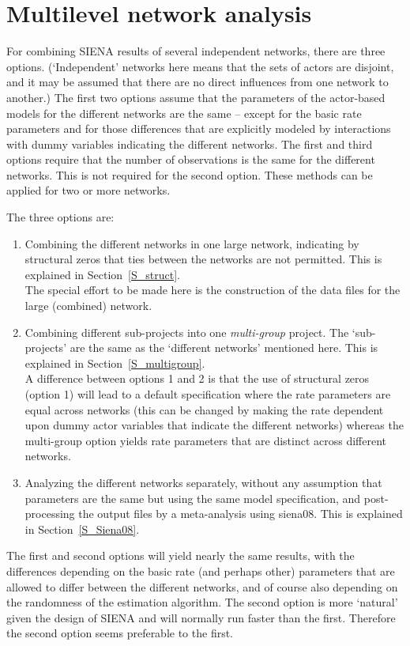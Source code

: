 \documentclass[a4paper,fleqn,11pt]{article}
\newcommand{\+}{\, + \,}
\newcommand{\SI}{{\sf SIENA }}
\begin{document}
\newpage
\section{Multilevel network analysis}
\label{S_mulev}

For combining \SI results of several independent networks,
there are three options.
(`Independent'  networks here means that the sets of actors are
disjoint, and it may be assumed that there are no direct influences
from one network to another.)
The first two options assume that the parameters
of the actor-based models for the different
networks are the same -- except
for the basic rate parameters and for
those differences that are explicitly modeled by interactions
with dummy variables indicating the different networks.
The first and third options require that the number of observations
is the same for the different networks. This is not required for the
second option.
These methods can be applied for two or more networks.
\medskip

\noindent
The three options are:
\begin{enumerate}
\item Combining the different networks in one large network,
      indicating by structural zeros that ties between the
      networks are not permitted.
      This is explained in Section~\ref{S_struct}.\\
      The special effort to be made here is the construction
      of the data files for the large (combined) network.
\item Combining different sub-projects
      into one \emph{multi-group} project.
      The `sub-projects' are the same as the `different networks'
      mentioned here.
      This is explained in Section~\ref{S_multigroup}.\\
      A difference between options 1 and 2 is that the use
      of structural zeros (option 1) will lead to a default specification
      where the rate parameters are equal across networks
      (this can be changed by making the rate dependent upon dummy actor
      variables that indicate the different networks)
      whereas the multi-group option yields rate parameters
      that are distinct across different networks.
\item Analyzing the different networks separately, without any assumption
      that parameters are the same but using the same model specification,
      and post-processing the output files by a meta-analysis
      using \textsf{siena08}.
      This is explained in Section~\ref{S_Siena08}.
\end{enumerate}
The first and second options will yield nearly the same results, with the
differences depending on the basic rate (and perhaps other) parameters
that are
allowed to differ between the different networks, and of course
also depending on the randomness of the estimation algorithm.
The second option is more `natural' given the design of \SI and
will normally run faster than the first.
Therefore the second option seems preferable to the first.
\end{document}
